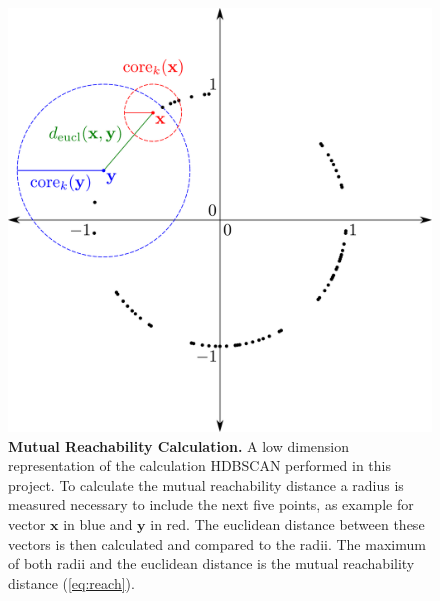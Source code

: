\begin{figure}[!hbt]
    \centering
    \includegraphics[width=\textwidth]{Graphics/HDB.pdf}
    \caption[Mutual Reachability Calculation]{\textbf{Mutual Reachability Calculation.} A low dimension representation of the calculation \gls{HDBSCAN} performed in this project. To calculate the mutual reachability distance a radius is measured necessary to include the next five points, as example for vector $\mathbf{x}$ in blue and $\mathbf{y}$ in red. The euclidean distance between these vectors is then calculated and compared to the radii. The maximum of both radii and the euclidean distance is the mutual reachability distance (\autoref{eq:reach}).}
    \label{fig:HDB}
\end{figure}

